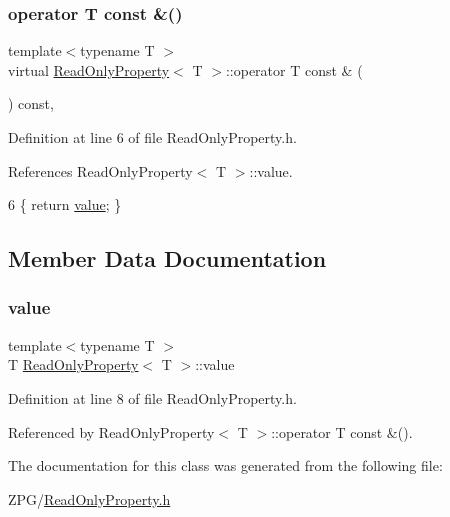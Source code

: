 \subsubsection{\texorpdfstring{operator T const \&()}{operator T const \&()}}
{\footnotesize\ttfamily template$<$typename T $>$ \\
virtual \mbox{\hyperlink{classReadOnlyProperty}{Read\+Only\+Property}}$<$ T $>$\+::operator T const \& (\begin{DoxyParamCaption}{ }\end{DoxyParamCaption}) const\hspace{0.3cm}{\ttfamily [inline]}, {\ttfamily [virtual]}}



Definition at line 6 of file Read\+Only\+Property.\+h.



References Read\+Only\+Property$<$ T $>$\+::value.


\begin{DoxyCode}
6 \{ \textcolor{keywordflow}{return} \mbox{\hyperlink{classReadOnlyProperty_a2c873d913c72f4a024499e0ff68bb527}{value}}; \}
\end{DoxyCode}


\subsection{Member Data Documentation}
\mbox{\label{classReadOnlyProperty_a2c873d913c72f4a024499e0ff68bb527}} 
\subsubsection{\texorpdfstring{value}{value}}
{\footnotesize\ttfamily template$<$typename T $>$ \\
T \mbox{\hyperlink{classReadOnlyProperty}{Read\+Only\+Property}}$<$ T $>$\+::value\hspace{0.3cm}{\ttfamily [protected]}}



Definition at line 8 of file Read\+Only\+Property.\+h.



Referenced by Read\+Only\+Property$<$ T $>$\+::operator T const \&().



The documentation for this class was generated from the following file\+:\begin{DoxyCompactItemize}
\item 
Z\+P\+G/\mbox{\hyperlink{ReadOnlyProperty_8h}{Read\+Only\+Property.\+h}}\end{DoxyCompactItemize}
